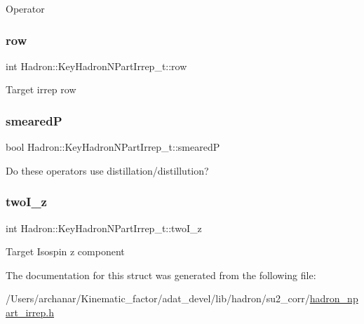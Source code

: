 Operator \mbox{\label{structHadron_1_1KeyHadronNPartIrrep__t_ac3322541750f4854d3af8e39c40148f0}} 
\subsubsection{\texorpdfstring{row}{row}}
{\footnotesize\ttfamily int Hadron\+::\+Key\+Hadron\+N\+Part\+Irrep\+\_\+t\+::row}

Target irrep row \mbox{\label{structHadron_1_1KeyHadronNPartIrrep__t_adc168c5e032072a880936aefb45a3e1e}} 
\subsubsection{\texorpdfstring{smearedP}{smearedP}}
{\footnotesize\ttfamily bool Hadron\+::\+Key\+Hadron\+N\+Part\+Irrep\+\_\+t\+::smearedP}

Do these operators use distillation/distillution? \mbox{\label{structHadron_1_1KeyHadronNPartIrrep__t_ad84ecd917052923a7f2c690ab2730dfa}} 
\subsubsection{\texorpdfstring{twoI\_z}{twoI\_z}}
{\footnotesize\ttfamily int Hadron\+::\+Key\+Hadron\+N\+Part\+Irrep\+\_\+t\+::two\+I\+\_\+z}

Target Isospin z component 

The documentation for this struct was generated from the following file\+:\begin{DoxyCompactItemize}
\item 
/\+Users/archanar/\+Kinematic\+\_\+factor/adat\+\_\+devel/lib/hadron/su2\+\_\+corr/\mbox{\hyperlink{lib_2hadron_2su2__corr_2hadron__npart__irrep_8h}{hadron\+\_\+npart\+\_\+irrep.\+h}}\end{DoxyCompactItemize}

